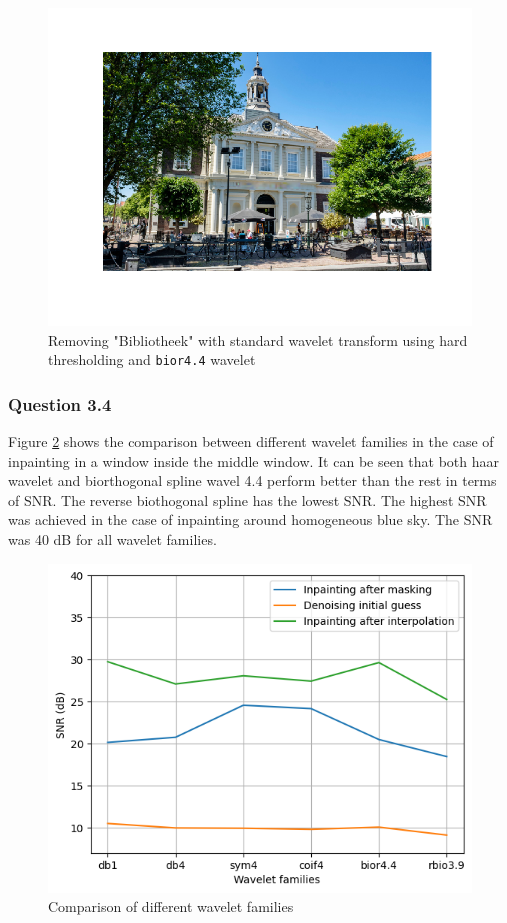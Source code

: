\documentclass[a4paper]{article}
\begin{document}
\begin{figure}[H]
	\centering %
	\includegraphics[width=0.7\linewidth]{Images/non-RedundantAllLeters.png}
	\caption{Removing "Bibliotheek" with  standard wavelet transform using hard thresholding and \texttt{bior4.4} wavelet}
	\label{NonRedundBib}
\end{figure}


\subsubsection{Question 3.4}
Figure \ref{windowaveletcomparer} shows the comparison between different wavelet families in the case of inpainting in a window inside the middle window. It can be seen that both haar wavelet and biorthogonal spline wavel 4.4 perform better than the rest in terms of SNR. The reverse biothogonal spline has the lowest SNR. The highest SNR was achieved in the case of inpainting around homogeneous blue sky. The SNR was 40 dB for all wavelet families.

\begin{figure}[H]
	\centering %
	\includegraphics[width=0.7\linewidth]{Images/wavelet_comparison_window.png}
	\caption{Comparison of different wavelet families}
	\label{windowaveletcomparer}
\end{figure}
\end{document}
